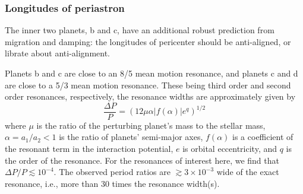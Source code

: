 \documentclass[fleqn,usenatbib]{mnras} %
\begin{document}


\subsubsection{Longitudes of periastron}

The inner two planets, b and c, have an additional robust prediction from 
migration and damping:
the longitudes of pericenter should be anti-aligned, or librate about
anti-alignment. %

Planets b and c are close to an 8/5 mean motion resonance, and planets c and d are close to a 5/3 mean motion resonance. These being third order and second order resonances, respectively, the resonance widths are approximately given by~\citep{Murray1999}
\begin{equation}
\frac{\Delta P}{P} = (12\mu\alpha |f(\alpha)| e^q)^{1/2}
\label{e:reswidth}\end{equation}
where $\mu$ is the ratio of the perturbing planet's mass to the stellar mass, $\alpha{=}a_1/a_2{<}1$ is the ratio of planets' semi-major axes, $f(\alpha)$ is a coefficient of the resonant term in the interaction potential, $e$ is orbital eccentricity, and $q$ is the order of the resonance.  For the resonances of interest here, we find that $\Delta P/P\lesssim10^{-4}$. The observed period ratios are $\gtrsim3\times10^{-3}$ wide of the exact resonance, i.e., more than 30 times the resonance width(s).
\end{document}
